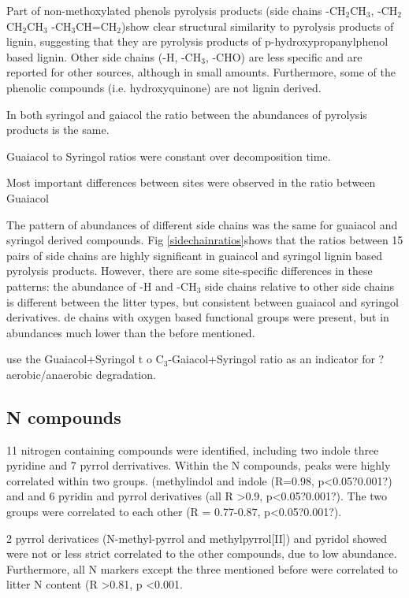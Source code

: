 \documentclass[preprint,review,12pt]{elsarticle}
\begin{document}
Part of non-methoxylated phenols pyrolysis products (side chains -CH$_2$CH$_3$, -CH$_2$CH$_2$CH$_3$ -CH$_3$CH=CH$_2$)show clear structural similarity to pyrolysis products of lignin, suggesting that they are pyrolysis products of p-hydroxypropanylphenol based lignin. Other side chains (-H, -CH$_3$, -CHO) are less specific and are reported for other sources, although in small amounts. Furthermore, some of the phenolic compounds (i.e. hydroxyquinone) are not lignin derived. 

In both syringol and gaiacol the ratio between the abundances of pyrolysis products is the same.

Guaiacol to Syringol ratios were constant over decomposition time. 

Most important differences between sites were observed in the ratio between Guaiacol


The pattern of abundances of different side chains was the same for guaiacol and syringol derived compounds. Fig \ref{sidechainratios}shows that the ratios between 15 pairs of side chains are highly significant in guaiacol and syringol lignin based pyrolysis products. However, there are some site-specific differences in these patterns: the abundance of -H and -CH$_3$ side chains relative to other side chains is different between the litter types, but consistent between guaiacol and syringol derivatives. 
  de chains with oxygen based functional groups were present, but in abundances much lower than the before mentioned. 

\cite{Kuder1998, Schellekens2009} use the Guaiacol+Syringol t o C$_3$-Gaiacol+Syringol ratio as an indicator for ?aerobic/anaerobic degradation. 

\subsection{N compounds}

11 nitrogen containing compounds were identified, including two indole three pyridine and 7 pyrrol derrivatives. Within the N compounds, peaks were highly correlated within two groups.  (methylindol and indole (R=0.98, p\textless 0.05?0.001?) and  and 6 pyridin and pyrrol derivatives (all R \textgreater 0.9, p\textless 0.05?0.001?). The two groups were correlated to each other (R = 0.77-0.87, p\textless 0.05?0.001?). 

2 pyrrol derivatices (N-methyl-pyrrol and methylpyrrol[II]) and pyridol showed were not or less strict correlated to the other compounds, due to low abundance. Furthermore, all N markers except the three mentioned before were correlated to litter N content (R \textgreater 0.81, p \textless 0.001.
\end{document}
